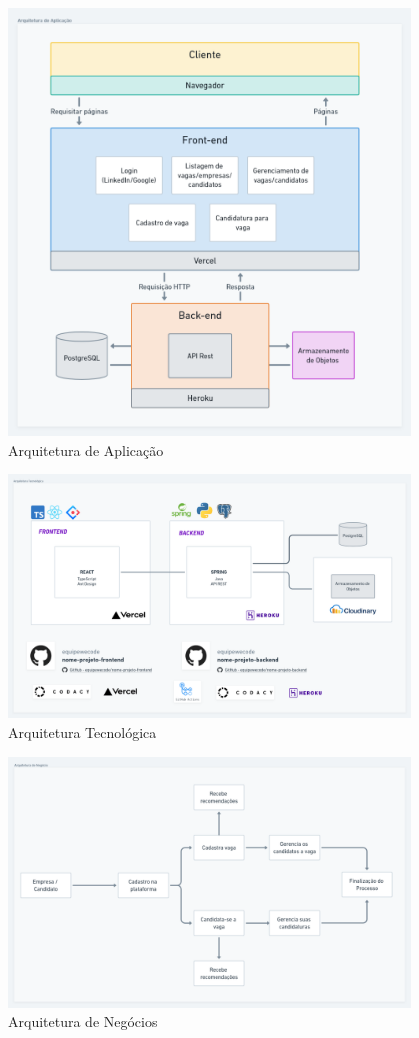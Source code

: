 \begin{figure}[H]
	\centering
	\caption{\label{fig-arq-app}Arquitetura de Aplicação}
	\includegraphics[width=0.95\textwidth]{../imagens/arq-proj-arq-app2.png}
\end{figure}

\begin{figure}[H]
	\centering
	\caption{\label{fig-arq-tec}Arquitetura Tecnológica}
	\includegraphics[width=0.95\textwidth]{../imagens/arq-proj-arq-tec2.png}
\end{figure}

\begin{figure}[H]
	\centering
	\caption{\label{fig-arq-negocio}Arquitetura de Negócios}
	\includegraphics[width=0.95\textwidth]{../imagens/arq-proj-arq-negocio2.png}
\end{figure}
